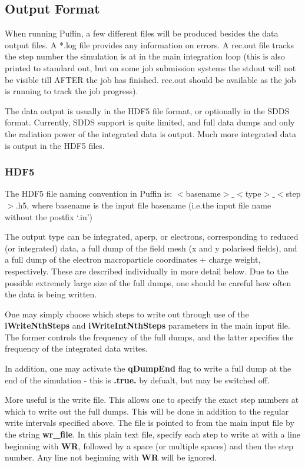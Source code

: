 \documentclass[12pt]{article}%
\begin{document}
\subsection{Output Format}

When running Puffin, a few different files will be produced besides the data output files. A *.log file provides any information on errors. A rec.out file tracks the step number the simulation is at in the main integration loop (this is also printed to standard out, but on some job submission systems the stdout will not be visible till AFTER the job has finished. rec.out should be available as the job is running to track the job progress).

The data output is usually in the HDF5 file format, or optionally in the SDDS format. Currently, SDDS support is quite limited, and full data dumps and only the radiation power of the integrated data is output. Much more integrated data is output in the HDF5 files.

\subsubsection{HDF5}

The HDF5 file naming convention in Puffin is: $<$basename$>\_<$type$>\_<$step$>$.h5, where basename is the input file basename (i.e.the input file name without the postfix `.in')

The output type can be integrated, aperp, or electrons, corresponding to reduced (or integrated) data, a full dump of the field mesh (x and y polarised fields), and a full dump of the electron macroparticle coordinates $+$ charge weight, respectively. These are described individually in more detail below. Due to the possible extremely large size of the full dumps, one should be careful how often the data is being written.

One may simply choose which steps to write out through use of the {\bf iWriteNthSteps} and {\bf iWriteIntNthSteps} parameters in the main input file. The former controls the frequency of the full dumps, and the latter specifies the frequency of the integrated data writes.

In addition, one may activate the {\bf qDumpEnd} flag to write a full dump at the end of the simulation - this is {\bf .true.} by defualt, but may be switched off.

More useful is the write file. This allows one to specify the exact step numbers at which to write out the full dumps. This will be done in addition to the regular write intervals specified above. The file is pointed to from the main input file by the string {\bf wr\_file}. In this plain text file, specify each step to write at with a line beginning with {\bf WR}, followed by a space (or multiple spaces) and then the step number. Any line not beginning with {\bf WR} will be ignored.
\end{document}
